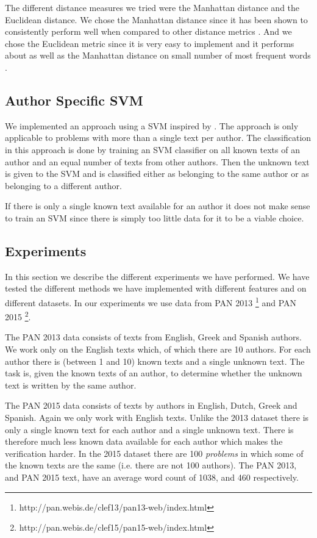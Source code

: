 The different distance measures we tried were the Manhattan distance and the
Euclidean distance. We chose the Manhattan distance since it has been shown to
consistently perform well when compared to other distance metrics
\cite{evert2015towards}. And we chose the Euclidean metric since it is very easy
to implement and it performs about as well as the Manhattan distance on small
number of most frequent words \cite{evert2015towards}.

\subsection{Author Specific SVM} \label{subsec:method:author_specific_svm}
We implemented an approach using a \gls{SVM} inspired by \cite{hansen2014}. The
approach is only applicable to problems with more than a single text per author.
The classification in this approach is done by training an \gls{SVM} classifier
on all known texts of an author and an equal number of texts from other authors.
Then the unknown text is given to the \gls{SVM} and is classified either as
belonging to the same author or as belonging to a different author.

If there is only a single known text available for an author it does not make
sense to train an \gls{SVM} since there is simply too little data for it
to be a viable choice.

\subsection{Experiments} \label{subsec:method:experiments}
In this section we describe the different experiments we have performed.
We have tested the different methods we have implemented with different
features and on different datasets. In our experiments we use data from PAN
2013 \footnote{http://pan.webis.de/clef13/pan13-web/index.html} and PAN 2015
\footnote{http://pan.webis.de/clef15/pan15-web/index.html}.

The PAN 2013 data consists of texts from English, Greek and Spanish authors. We
work only on the English texts which, of which there are 10 authors. For each
author there is (between 1 and 10) known texts and a single unknown text. The
task is, given the known texts of an author, to determine whether the unknown
text is written by the same author.

The PAN 2015 data consists of texts by authors in English, Dutch, Greek and
Spanish. Again we only work with English texts. Unlike the 2013 dataset there
is only a single known text for each author and a single unknown text. There
is therefore much less known data available for each author which makes the
verification harder. In the 2015 dataset there are 100 \textit{problems} in
which some of the known texts are the same (i.e. there are not 100 authors).
The PAN 2013, and PAN 2015 text, have an average word count of 1038, and 460
respectively.

